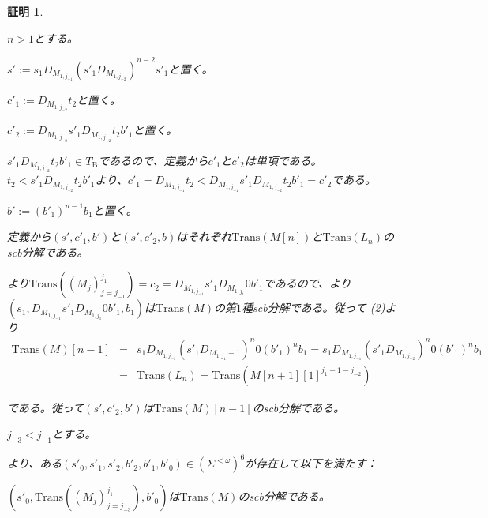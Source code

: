 \documentclass[dvipdfmx,uplatex]{jsarticle}
\theoremstyle{customnonumberbreakfortheorem}
\theoremstyle{customnonumberbreakforproof}
\newtheorem{hideableproof}{証明}
\begin{document}
\begin{hideableproof}
\begin{indented}
\begin{indented}
\begin{indented}
			\end{indented}
			\item \(n > 1\)とする。
			\begin{indented}
				\item \(s' := s_1 D_{M_{1,j_{-1}}} (s'_1 D_{M_{1,j_{-2}}})^{n-2} s'_1\)と置く。
				\item \(c'_1 := D_{M_{1,j_{-2}}} t_2\)と置く。
				\item \(c'_2 := D_{M_{1,j_{-2}}} s'_1 D_{M_{1,j_{-2}}} t_2 b'_1\)と置く。
				\item \(s'_1 D_{M_{1,j_{-2}}} t_2 b'_1 \in T_{\textrm{B}}\)であるので、定義から\(c'_1\)と\(c'_2\)は単項である。\(t_2 < s'_1 D_{M_{1,j_{-2}}} t_2 b'_1\)より、\(c'_1 = D_{M_{1,j_{-1}}} t_2 < D_{M_{1,j_{-1}}} s'_1 D_{M_{1,j_{-2}}} t_2 b'_1 = c'_2\)である。
			\end{indented}
			\item \(b' := (b'_1)^{n-1} b_1\)と置く。
			\item 定義から\((s',c'_1,b')\)と\((s',c'_2,b)\)はそれぞれ\(\textrm{Trans}(M[n])\)と\(\textrm{Trans}(L_n)\)のscb分解である。
			\item {}より\(\textrm{Trans}((M_j)_{j=j_{-1}}^{j_1}) = c_2 = D_{M_{1,j_{-1}}} s'_1 D_{M_{1,j_1}} 0 b'_1\)であるので、より\((s_1,D_{M_{1,j_{-1}}} s'_1 D_{M_{1,j_1}} 0 b'_1,b_1)\)は\(\textrm{Trans}(M)\)の第\(1\)種scb分解である。従って (2)より
			\begin{eqnarray*}
			\textrm{Trans}(M)[n-1] & = & s_1 D_{M_{1,j_{-1}}} (s'_1 D_{M_{1,j_1}-1})^n 0 (b'_1)^n b_1 = s_1 D_{M_{1,j_{-1}}} (s'_1 D_{M_{1,j_{-2}}})^n 0 (b'_1)^n b_1 \\
			& = & \textrm{Trans}(L_n) = \textrm{Trans}(M[n+1][1]^{j_1-1-j_{-2}})
			\end{eqnarray*}
			\item である。従って\((s',c'_2,b')\)は\(\textrm{Trans}(M)[n-1]\)のscb分解である。
		\end{indented}
		\item
		\item \(j_{-3} < j_{-1}\)とする。
	\end{indented}
	より、ある\((s'_0,s'_1,s'_2,b'_2,b'_1,b'_0) \in (\Sigma^{< \omega})^6\)が存在して以下を満たす：
	\begin{indented}
		\item
		\begin{penumerate}
			\item \((s'_0,\textrm{Trans}((M_j)_{j=j_{-3}}^{j_1}),b'_0)\)は\(\textrm{Trans}(M)\)のscb分解である。

\end{penumerate}
\end{indented}
\end{hideableproof}
\end{document}
